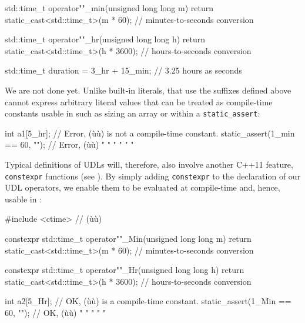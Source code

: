 \begin{emcppslisting}[emcppsbatch=e5]
std::time_t operator""_min(unsigned long long m)
{
    return static_cast<std::time_t>(m * 60);  // minutes-to-seconds conversion
}

std::time_t operator""_hr(unsigned long long h)
{
    return static_cast<std::time_t>(h * 3600);  // hours-to-seconds conversion
}

std::time_t duration = 3_hr + 15_min;  // 3.25 hours as seconds
\end{emcppslisting}

\noindent We are not done yet. Unlike built-in literals,  that use the suffixes defined above cannot express arbitrary literal values
that can be treated as compile-time constants usable in
 such as sizing an array or within a
\lstinline!static_assert!:

\begin{emcppslisting}
int a1[5_hr];                    // Error, (ù{}ù) is not a compile-time constant.
static_assert(1_min == 60, "");  // Error, (ù{}ù) "  "  "    "      "     "
\end{emcppslisting}

\noindent Typical definitions of UDLs will, therefore, also involve another C++11
feature, \lstinline!constexpr! functions (see ). By simply adding
\lstinline!constexpr! to the declaration of our UDL operators, we enable
them to be evaluated at compile-time and, hence, usable in
:

\begin{emcppshiddenlisting}[emcppsbatch=e6]
#include <ctime>  // (ù{}ù)
\end{emcppshiddenlisting}
\begin{emcppslisting}[emcppsbatch=e6]
constexpr std::time_t operator""_Min(unsigned long long m)
{
    return static_cast<std::time_t>(m * 60);  // minutes-to-seconds conversion
}

constexpr std::time_t operator""_Hr(unsigned long long h)
{
    return static_cast<std::time_t>(h * 3600);  // hours-to-seconds conversion
}

int a2[5_Hr];                    // OK, (ù{}ù) is a compile-time constant.
static_assert(1_Min == 60, "");  // OK, (ù{}ù) " "    "     "      "
\end{emcppslisting}

